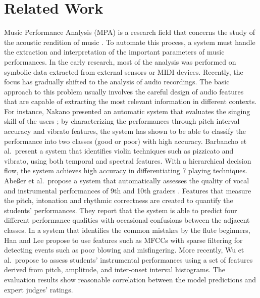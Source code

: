\documentclass[conference]{IEEEtran}
\begin{document}
\section{Related Work}\label{sec:relatedwork}
Music Performance Analysis (MPA) is a research field that concerns the study of the acoustic rendition of music \cite{lerch_software-based_2009}. To automate this process, a system must handle the extraction and interpretation of the important parameters of music performances. In the early research, most of the analysis was performed on symbolic data extracted from external sensors or MIDI devices. Recently, the focus has gradually shifted to the analysis of audio recordings. The basic approach to this problem usually involves the careful design of audio features that are capable of extracting the most relevant information in different contexts. For instance, Nakano presented an automatic system that evaluates the singing skill of the users \cite{Nakano2006a}; by characterizing the performances through pitch interval accuracy and vibrato features, the system has shown to be able to classify the performance into two classes (good or poor) with high accuracy. 
Barbancho et al.\  present a system that identifies violin techniques such as pizzicato and vibrato, using both temporal and spectral features\cite{Barbancho2009}. With a hierarchical decision flow, the system achieves high accuracy in differentiating 7 playing techniques. 
Abe{\ss}er et al.\ propose a system that automatically assesses the quality of vocal and instrumental performances of 9th and 10th graders \cite{Abeßer2013}. Features that measure the pitch, intonation and rhythmic correctness are created to quantify the students' performances. They report that the system is able to predict four different performance qualities with occasional confusions between the adjacent classes. In a system that identifies the common mistakes by the flute beginners, Han and Lee propose to use features such as MFCCs with sparse filtering for detecting events such as poor blowing and misfingering\cite{Han2014}.%
More recently, Wu et al.\  propose to assess students' instrumental performances using a set of features derived from pitch, amplitude, and inter-onset interval histograms\cite{Wu2016}. The evaluation results show reasonable correlation between the model predictions and expert judges' ratings. 
\end{document}
